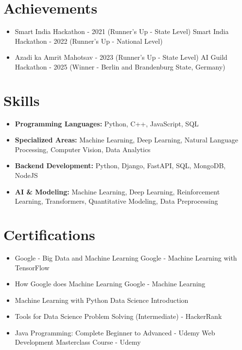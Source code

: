 \documentclass[a4paper,10pt]{article}
\begin{document}
\section*{Achievements}
\begin{itemize}
\item Smart India Hackathon - 2021 (Runner's Up - State Level) \hfill Smart India Hackathon - 2022 (Runner's Up - National Level)
\item Azadi ka Amrit Mahotsav - 2023 (Runner's Up - State Level) \hfill AI Guild Hackathon - 2025 (Winner - Berlin and Brandenburg State, Germany)
\end{itemize}

\section*{Skills}
\begin{itemize}
  \item \textbf{Programming Languages:} Python, C++, JavaScript, SQL
  \item \textbf{Specialized Areas:} Machine Learning, Deep Learning, Natural Language Processing, Computer Vision, Data Analytics
  \item \textbf{Backend Development:} Python, Django, FastAPI, SQL, MongoDB, NodeJS
  \item \textbf{AI \& Modeling:} Machine Learning, Deep Learning, Reinforcement Learning, Transformers, Quantitative Modeling, Data Preprocessing
\end{itemize}

\section*{Certifications}
\begin{itemize}
\item Google - Big Data and Machine Learning \hfill Google - Machine Learning with TensorFlow
\item How Google does Machine Learning \hfill Google - Machine Learning
\item Machine Learning with Python \hfill Data Science Introduction
\item Tools for Data Science \hfill Problem Solving (Intermediate) - HackerRank
\item Java Programming: Complete Beginner to Advanced - Udemy \hfill Web Development Masterclass Course - Udemy
\end{itemize}
\end{document}
